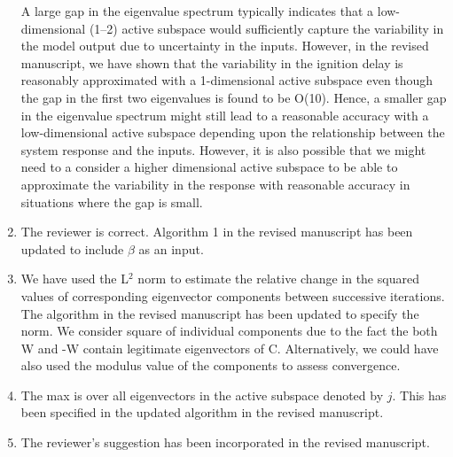 \documentclass[11pt,final]{article}
\newcommand{\referee}[1]{\vspace{.1ex}\noindent{\textcolor{blue}{#1}}}
\begin{document}
\begin{enumerate}[wide, labelwidth=!, labelindent=0pt]
\noindent A large gap in the eigenvalue spectrum typically indicates that a low-dimensional (1--2) active subspace 
would sufficiently capture the variability in the model output due to uncertainty in the inputs. However,
in the revised manuscript, we have shown that the variability in the ignition delay is reasonably
approximated with a 1-dimensional active subspace even though the gap in the first two eigenvalues
is found to be O(10). Hence, a smaller gap in the eigenvalue spectrum might still lead to a reasonable
accuracy with a low-dimensional active subspace depending upon the relationship between the
system response and the inputs. However, it is also possible that we might need to a consider a higher 
dimensional active subspace to be able to approximate the variability in the response with reasonable
accuracy in situations where the gap is small. 

\item \referee{11.33: Alg. 1: should have $\beta$ as input, too?}

\noindent The reviewer is correct. Algorithm 1 in the revised manuscript has been updated to include $\beta$
as an input. 

\item \referee{11.42: Which norm is used? Any intuition why squares of W are used, and not just W?}

\noindent We have used the L$^2$ norm to estimate the relative change in the squared values of corresponding
eigenvector components between successive iterations. The algorithm in the revised manuscript has been updated 
to specify the norm. 
We consider square of individual components due to the fact the both W and -W contain legitimate eigenvectors 
of C. Alternatively, we could have also used the modulus value of the components to assess convergence. 

\item \referee{11.45: what is max over?}

\noindent The max is over all eigenvectors in the active subspace denoted by $j$. This has been specified in
the updated algorithm in the revised manuscript.

\item \referee{12.29: 'higher-order' should be replaced with higher-index or smaller-magnitude, to avoid confusion.}

\noindent The reviewer's suggestion has been incorporated in the revised manuscript.


\end{enumerate}
\end{document}
